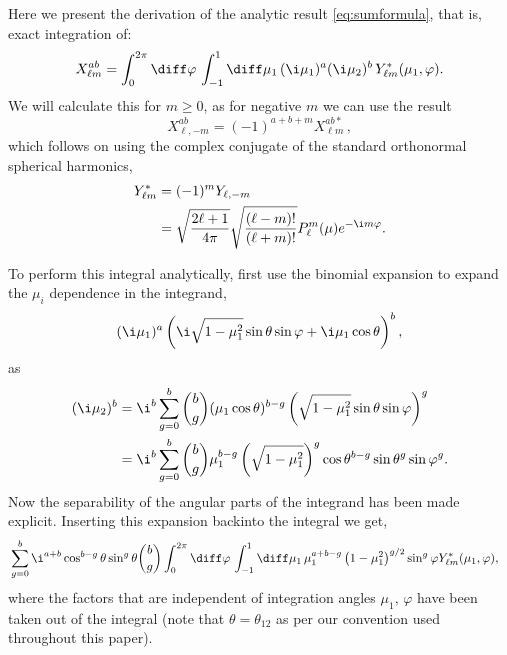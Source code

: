 Here we present the derivation of the analytic result \ref{eq:sumformula}, that is, exact integration of:
\begin{equation} X_{\ell m}^{ab} = \int_0^{2\pi} \diff\varphi\, \int_{-1}^1 \diff\mu_1\, (\i \mu_1)^a (\i \mu_2)^b \,Y_{\ell m}^*(\mu_1,\varphi).
\end{equation}
We will calculate this for $m\geq0$, as for negative $m$ we can use the result
\begin{equation}
X_{\ell, -m}^{ab} = (-1)^{a+b+m} X_{\ell m}^{ab*}\,,
\end{equation}
which follows on using the complex conjugate of the standard orthonormal spherical harmonics,
\begin{align}
Y_{\ell m}^* &= (-1)^m Y_{\ell, -m} \nonumber\\
&= \sqrt{\frac{2 \ell + 1}{4 \pi}} \sqrt{\frac{(\ell - m )!}{(\ell + m )!}} P_\ell^m(\mu) e^{-\i m \varphi}.
\end{align}

To perform this integral analytically, first use the binomial expansion to expand the \(\mu_i\) dependence in the integrand, 
\begin{equation}
( \i \mu_1)^a \left(\i \sqrt{1-\mu_1^2} \sin\theta \sin\varphi + \i \mu_1 \cos\theta \right)^b,
\end{equation}
as
\begin{align}
(\i \mu_2)^b &= \i^b \sum_{g=0}^b \binom{b}{g} (\mu_1 \cos\theta)^{b-g} \left(\sqrt{1-\mu_1^2}\sin\theta \sin\varphi\right)^g \nonumber\\
& =\i^b \sum_{g=0}^b \binom{b}{g} \mu_1^{b-g} \left(\sqrt{1-\mu_1^2}\right)^g \cos\theta^{b-g} \sin\theta^g \sin\varphi^g. 
\end{align}
Now the separability of the angular parts of the integrand has been made explicit. Inserting this expansion backinto the integral we get, 
\begin{align}
&\sum_{g=0}^b \i^{a+b} \cos^{b-g}\theta \sin^g\theta \binom{b}{g} \int_0^{2\pi}\diff\varphi\, \int_{-1}^1 \diff\mu_1\, \mu_1^{a+b-g} \left(1-\mu_1^2\right)^{g/2} \sin^g\varphi Y_{\ell m}^*(\mu_1,\varphi),
\end{align}
where the factors that are independent of integration angles \(\mu_1,\,\varphi\) have been taken out of the integral (note that \(\theta = \theta_{12}\) as per our convention used throughout this paper). 

